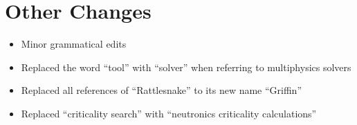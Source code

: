 \documentclass[answers,11pt]{exam}
\begin{document}
\begin{questions}
\end{questions}

\section*{Other Changes}

\begin{itemize}
    \item Minor grammatical edits
    \item Replaced the word ``tool'' with ``solver'' when referring to
    multiphysics solvers
    \item Replaced all references of ``Rattlesnake'' to its new name
    ``Griffin''
    \item Replaced ``criticality search'' with ``neutronics criticality
    calculations''
\end{itemize}



\end{document}
